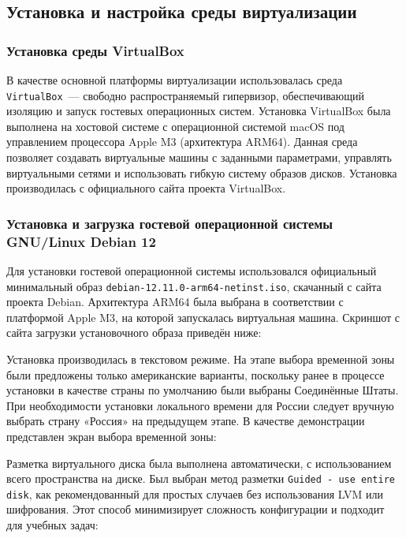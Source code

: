 \subsection{Установка и настройка среды виртуализации}

\subsubsection*{Установка среды VirtualBox}

В качестве основной платформы виртуализации использовалась среда \texttt{VirtualBox}~--- свободно распространяемый гипервизор, обеспечивающий изоляцию и запуск гостевых операционных систем. Установка VirtualBox была выполнена на хостовой системе с операционной системой macOS под управлением процессора Apple M3 (архитектура ARM64). Данная среда позволяет создавать виртуальные машины с заданными параметрами, управлять виртуальными сетями и использовать гибкую систему образов дисков. Установка производилась с официального сайта проекта VirtualBox.

\subsubsection*{Установка и загрузка гостевой операционной системы GNU/Linux Debian 12}

Для установки гостевой операционной системы использовался официальный минимальный образ \texttt{debian-12.11.0-arm64-netinst.iso}, скачанный с сайта проекта Debian. Архитектура ARM64 была выбрана в соответствии с платформой Apple M3, на которой запускалась виртуальная машина. Скриншот с сайта загрузки установочного образа приведён ниже:


Установка производилась в текстовом режиме. На этапе выбора временной зоны были предложены только американские варианты, поскольку ранее в процессе установки в качестве страны по умолчанию были выбраны Соединённые Штаты. При необходимости установки локального времени для России следует вручную выбрать страну «Россия» на предыдущем этапе. В качестве демонстрации представлен экран выбора временной зоны:


Разметка виртуального диска была выполнена автоматически, с использованием всего пространства на диске. Был выбран метод разметки \texttt{Guided - use entire disk}, как рекомендованный для простых случаев без использования LVM или шифрования. Этот способ минимизирует сложность конфигурации и подходит для учебных задач:

